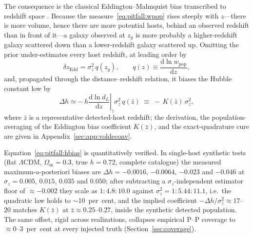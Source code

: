 The consequence is the classical Eddington--Malmquist bias transcribed to redshift space \citep{Eddington1913,Malmquist1922}.
Because the measure~\eqref{eq:pitfall:wpop} rises steeply with $z$---there is more volume, hence there are more potential hosts, behind an observed redshift than in front of it---a galaxy observed at $z_g$ is more probably a higher-redshift galaxy scattered down than a lower-redshift galaxy scattered up. Omitting the prior under-estimates every host redshift, at leading order by
\begin{equation}
  \delta z_{\mathrm{Edd}} = \sigma_z^{2}\, q(z_g),
  \qquad
  q(z) \equiv \frac{\mathrm{d}\ln w_{\mathrm{pop}}}{\mathrm{d}z},
  \label{eq:pitfall:eddz}
\end{equation}
and, propagated through the distance--redshift relation, it biases the Hubble constant low by
\begin{equation}
  \Delta h \simeq -\,h \left.\frac{\mathrm{d}\ln d_L}{\mathrm{d}z}\right|_{\bar{z}} \sigma_z^{2}\, q(\bar{z})
  \;\equiv\; -\,K(\bar{z})\,\sigma_z^{2},
  \label{eq:pitfall:hbias}
\end{equation}
where $\bar{z}$ is a representative detected-host redshift; the derivation, the population-averaging of the Eddington bias coefficient $K(\bar z)$, and the exact-quadrature cure are given in Appendix~\ref{sec:app:voldeconv}.

Equation~\eqref{eq:pitfall:hbias} is quantitatively verified. In single-host synthetic tests (flat $\Lambda$CDM, $\Omega_{\mathrm{m}}=0.3$, true $h=0.72$, complete catalogue) the measured maximum-a-posteriori biases are %
$\Delta h = -0.0016$, $-0.0064$, $-0.023$ and $-0.046$ at $\sigma_z = 0.005$, $0.015$, $0.035$ and $0.050$; %
after subtracting a $\sigma_z$-independent estimator floor of $\approx -0.002$ they scale as $1:4.8:10.0$ against $\sigma_z^2 = 1:5.44:11.1$, i.e.\ the quadratic law holds to $\sim$10~per~cent, %
and the implied coefficient $-\Delta h/\sigma_z^2 \approx 17$--$20$ matches $K(\bar z)$ at $\bar z \approx 0.25$--$0.27$, inside the synthetic detected population. %
The same offset, rigid across realizations, collapses empirical P--P coverage to $\approx 0$--3~per~cent at every injected truth (Section~\ref{sec:coverage}). %

